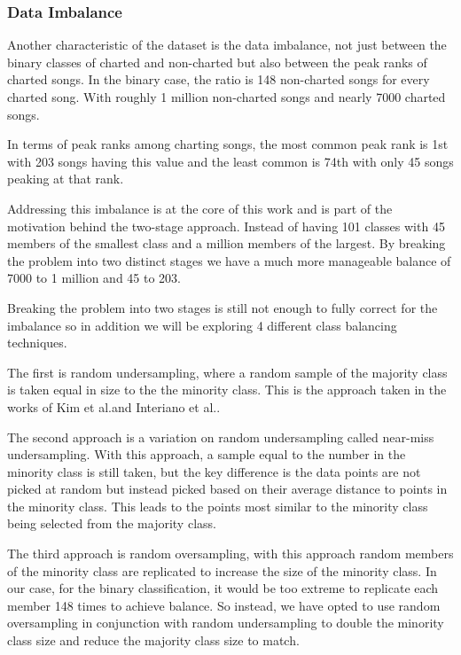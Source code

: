 \documentclass[conference]{IEEEtran}
\begin{document}
\subsubsection{Data Imbalance}
Another characteristic of the dataset is the data imbalance, not just between the binary classes of charted and non-charted but also between the peak ranks of charted songs. In the binary case, the ratio is 148 non-charted songs for every charted song. With roughly 1 million non-charted songs and nearly 7000 charted songs.

In terms of peak ranks among charting songs, the most common peak rank is 1st with 203 songs having this value and the least common is 74th with only 45 songs peaking at that rank.

Addressing this imbalance is at the core of this work and is part of the motivation behind the two-stage approach. Instead of having 101 classes with 45 members of the smallest class and a million members of the largest. By breaking the problem into two distinct stages we have a much more manageable balance of 7000 to 1 million and 45 to 203.

Breaking the problem into two stages is still not enough to fully correct for the imbalance so in addition we will be exploring 4 different class balancing techniques.

The first is random undersampling, where a random sample of the majority class is taken equal in size to the the minority class. This is the approach taken in the works of Kim et al.\cite{b9}and Interiano et al.\cite{b12}.


The second approach is a variation on random undersampling called near-miss undersampling. With this approach, a sample equal to the number in the minority class is still taken, but the key difference is the data points are not picked at random but instead picked based on their average distance to points in the minority class. This leads to the points most similar to the minority class being selected from the majority class.

The third approach is random oversampling, with this approach random members of the minority class are replicated to increase the size of the minority class. In our case, for the binary classification, it would be too extreme to replicate each member 148 times to achieve balance. So instead, we have opted to use random oversampling in conjunction with random undersampling to double the minority class size and reduce the majority class size to match.
\end{document}

